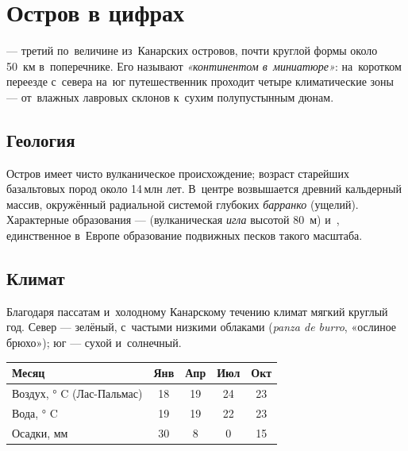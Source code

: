 \chapter{Остров в цифрах}


 --- третий по~величине из~Канарских островов,
почти круглой формы около 50~км в~поперечнике. Его называют
\textit{«континентом в~миниатюре»}: на~коротком переезде
с~севера на~юг путешественник проходит четыре климатические
зоны --- от~влажных лавровых склонов к~сухим полупустынным дюнам.


\section{Геология}

Остров имеет чисто вулканическое происхождение; возраст старейших
базальтовых пород около 14\,млн лет. В~центре возвышается древний
кальдерный массив, окружённый радиальной системой глубоких
\textit{барранко} (ущелий). Характерные образования ---
 (вулканическая \textit{игла} высотой 80~м)
и~, единственное в~Европе образование
подвижных песков такого масштаба.

\section{Климат}

Благодаря пассатам и~холодному Канарскому течению климат мягкий
круглый год. Север --- зелёный, с~частыми низкими облаками
(\textit{panza de burro}, «ослиное брюхо»); юг --- сухой и~солнечный.

\begin{center}\small
\begin{tabular}{lcccc}
\toprule
Месяц      & Янв & Апр & Июл & Окт \\
\midrule
Воздух, ° C (Лас-Пальмас) & 18 & 19 & 24 & 23 \\
Вода, ° C                 & 19 & 19 & 22 & 23 \\
Осадки, мм                      & 30 & 8  & 0  & 15 \\
\bottomrule
\end{tabular}
\end{center}

